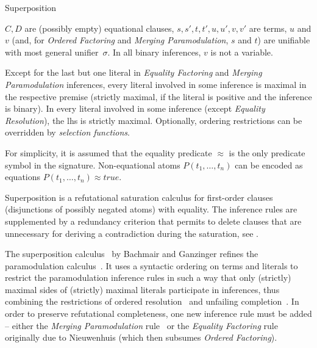 \begin{entry}{Superposition}
\begin{calculus}
$C,D$ are (possibly empty) equational clauses,
$s,s',t,t',u,u',v,v'$ are terms,
$u$ and $v$ (and, for \textit{Ordered Factoring}
and \textit{Merging Paramodulation}, $s$ and $t$)
are unifiable with most general unifier~$\sigma$.
In all binary inferences, $v$ is not a variable.

\vspace{\myspace}

Except for the last but one literal in
\textit{Equality Factoring} and \textit{Merging Paramodulation} inferences,
every literal involved in some inference
is maximal in the respective premise
(strictly maximal, if the literal is positive and the inference is binary).
In every literal involved in some inference
(except \textit{Equality Resolution}),
the lhs is strictly maximal.
Optionally,
ordering restrictions can be overridden by \emph{selection functions}.

\vspace{\myspace}

For simplicity, it is assumed that the equality predicate $\approx$
is the only predicate symbol in the signature.
Non-equational atoms $P(t_1,\dots,t_n)$ can be encoded as
equations $P(t_1,\dots,t_n) \approx \mathit{true}$.

% 
\end{calculus}



\begin{clarifications}
Superposition is a refutational saturation calculus for
first-order clauses (disjunctions of possibly negated atoms)
with equality.
The inference rules are supplemented by a redundancy criterion
that permits to delete clauses that are unnecessary for
deriving a contradiction during the saturation, see .
\end{clarifications}

\begin{history}
The superposition
calculus~\cite{BachmairGanzinger1990CTRS,BachmairGanzinger1994JLC}
by Bachmair and Ganzinger
refines the paramodulation calculus~.
It uses a syntactic ordering on terms and
literals to restrict the paramodulation inference rules
in such a way that only (strictly) maximal sides of (strictly) maximal
literals participate in inferences,
thus combining the restrictions of
ordered resolution~ and
unfailing completion~.
In order to preserve refutational completeness, one new
inference rule must be added -- either
the \textit{Merging Paramodulation} rule~\cite{BachmairGanzinger1990CTRS}
or the \textit{Equality Factoring} rule originally due to Nieuwenhuis
(which then subsumes \textit{Ordered Factoring}).


\end{history}
\end{entry}
